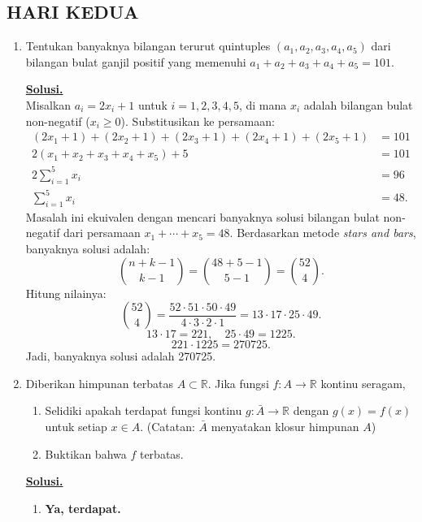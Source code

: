 \documentclass[12pt,twoside]{article}
\newenvironment{solution}
{
	\par\noindent\textbf{\underline{Solusi.}}\\
}
{
	\par
}
\begin{document}
\subsection{HARI KEDUA}
\begin{enumerate}
  \item Tentukan banyaknya bilangan terurut quintuples $(a_1,a_2,a_3,a_4,a_5)$ dari bilangan bulat ganjil positif yang memenuhi $a_1+a_2+a_3+a_4+a_5=101$.
        \begin{solution}
          Misalkan $a_i=2x_i+1$ untuk $i=1,2,3,4,5$, di mana $x_i$ adalah bilangan bulat non-negatif ($x_i\ge 0$).
          Substitusikan ke persamaan:
          \begin{align*}
            (2x_1+1) + (2x_2+1) + (2x_3+1) + (2x_4+1) + (2x_5+1) & = 101 \\
            2(x_1+x_2+x_3+x_4+x_5) + 5                           & = 101 \\
            2\sum_{i=1}^5 x_i                                    & = 96  \\
            \sum_{i=1}^5 x_i                                     & = 48.
          \end{align*}
          Masalah ini ekuivalen dengan mencari banyaknya solusi bilangan bulat non-negatif dari persamaan $x_1+\cdots+x_5=48$.
          Berdasarkan metode \textit{stars and bars}, banyaknya solusi adalah:
          \[ \binom{n+k-1}{k-1} = \binom{48+5-1}{5-1} = \binom{52}{4}. \]
          Hitung nilainya:
          \[ \binom{52}{4} = \frac{52 \cdot 51 \cdot 50 \cdot 49}{4 \cdot 3 \cdot 2 \cdot 1} = 13 \cdot 17 \cdot 25 \cdot 49. \]
          \[ 13 \cdot 17 = 221, \quad 25 \cdot 49 = 1225. \]
          \[ 221 \cdot 1225 = 270725. \]
          Jadi, banyaknya solusi adalah 270725.
        \end{solution}
  \item Diberikan himpunan terbatas $A\subset \mathbb{R}$. Jika fungsi $f:A\rightarrow\mathbb{R}$ kontinu seragam,
        \begin{enumerate}
          \item Selidiki apakah terdapat fungsi kontinu $g:\bar{A}\rightarrow\mathbb{R}$ dengan $g(x)=f(x)$ untuk setiap $x\in A$. (Catatan: $\bar{A}$ menyatakan klosur himpunan $A$)
          \item Buktikan bahwa $f$ terbatas.
        \end{enumerate}
        \begin{solution}
          \begin{enumerate}
            \item[(a)] \textbf{Ya, terdapat.}

\end{enumerate}
\end{solution}
\end{enumerate}
\end{document}
